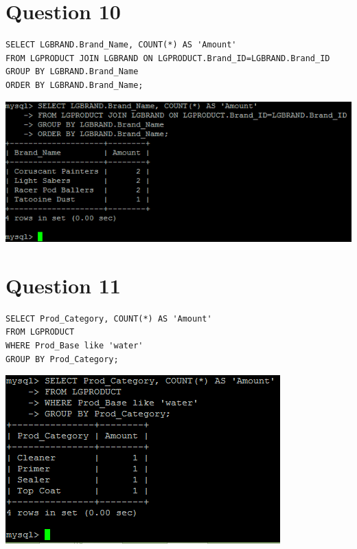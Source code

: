 \documentclass[a4paper,10pt]{article}
\begin{document}
\section*{Question 10}
\lstset{
            language=SQL,
            breaklines=true
            }
        \begin{lstlisting}[frame=single]
        SELECT LGBRAND.Brand_Name, COUNT(*) AS 'Amount'
FROM LGPRODUCT JOIN LGBRAND ON LGPRODUCT.Brand_ID=LGBRAND.Brand_ID
GROUP BY LGBRAND.Brand_Name
ORDER BY LGBRAND.Brand_Name;

        \end{lstlisting}
\includegraphics{Queries/Question_10/Question_10_screenshot.PNG}
\section*{Question 11}
\lstset{
            language=SQL,
            breaklines=true
            }
        \begin{lstlisting}[frame=single]
        SELECT Prod_Category, COUNT(*) AS 'Amount'
FROM LGPRODUCT
WHERE Prod_Base like 'water'
GROUP BY Prod_Category;

        \end{lstlisting}
\includegraphics{Queries/Question_11/Question_11_screenshot.PNG}
\end{document}
